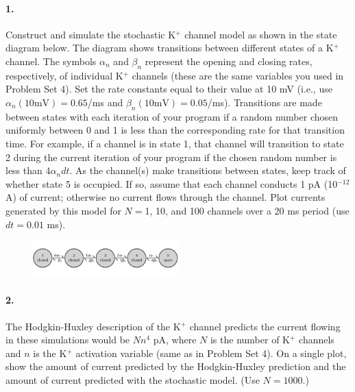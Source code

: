 \documentclass[11pt]{article}
\begin{document}
\paragraph{1.} Construct and simulate the stochastic K$^+$ channel model as shown in the state diagram below.  The diagram shows transitions between different states of a K$^+$ channel.  The symbols $\alpha_n$ and $\beta_n$ represent the opening and closing rates, respectively, of individual K$^+$ channels (these are the same variables you used in Problem Set 4).  Set the rate constants equal to their value at 10 mV (i.e., use $\alpha_n(10 \mathrm{mV}) = 0.65$/ms and $\beta_n(10 \mathrm{mV}) = 0.05$/ms).  Transitions are made between states with each iteration of your program if a random number chosen uniformly between 0 and 1 is less than the corresponding rate for that transition time.  For example, if a channel is in state 1, that channel will transition to state 2 during the current iteration of your program if the chosen random number is less than $4\alpha_ndt$.  As the channel(s) make transitions between states, keep track of whether state 5 is occupied.  If so, assume that each channel conducts 1 pA (10$^{-12}$ A) of current; otherwise no current flows through the channel.  Plot currents generated by this model for $N = $1, 10, and 100 channels over a 20 ms period (use $dt = 0.01$ ms).

\begin{figure}[h]
\begin{center}
\includegraphics[width=0.5\textwidth]{hodgkin_huxley_advanced/K_state_diagram}
\end{center}
\end{figure}

\paragraph{2.}  The Hodgkin-Huxley description of the K$^+$ channel predicts the current flowing in these simulations would be $Nn^4$ pA, where $N$ is the number of  K$^+$ channels and $n$ is the K$^+$ activation variable (same as in Problem Set 4).  On a single plot, show the amount of current predicted by the Hodgkin-Huxley prediction and the amount of current predicted with the stochastic model.  (Use $N = 1000$.)
\end{document}
